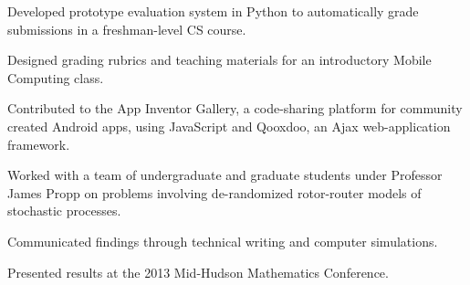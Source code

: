 \documentclass[11pt]{deedy-resume-openfont}
\begin{document}
\begin{minipage}[t]{0.66\textwidth}
\vspace{\topsep} 
\vspace{\topsep} 

\begin{tightemize} 
\item Developed prototype evaluation system in Python to automatically grade submissions in a freshman-level CS course.
\item Designed grading rubrics and teaching materials for an introductory Mobile Computing class.
\item Contributed to the App Inventor Gallery, a code-sharing platform for community created Android apps, using JavaScript and Qooxdoo, an Ajax web-application framework. 
\end{tightemize}
\sectionsep

\vspace{\topsep} 
\vspace{\topsep} 

\begin{tightemize}
\item Worked with a team of undergraduate and graduate students under Professor James Propp on problems involving de-randomized rotor-router models of stochastic processes.
\item Communicated ﬁndings through technical writing and computer simulations.
\item Presented results at the 2013 Mid-Hudson Mathematics Conference.
\end{tightemize}
\sectionsep


\end{minipage} 
\end{document}
